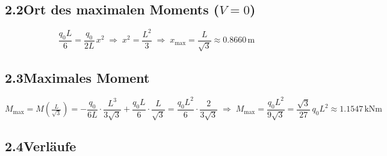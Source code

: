 \documentclass[a4paper,11pt]{article}
\begin{document}
\subsection*{2.2\quad Ort des maximalen Moments ($V = 0$)}

\[
  \frac{q_0 L}{6} = \frac{q_0}{2L}\,x^2
  \;\Rightarrow\; x^2 = \frac{L^2}{3}
  \;\Rightarrow\; \boxed{x_{\max} = \frac{L}{\sqrt{3}} \approx 0.8660\,\text{m}}
\]

\subsection*{2.3\quad Maximales Moment}

\[
  M_{\max} = M\!\left(\tfrac{L}{\sqrt{3}}\right)
  = -\frac{q_0}{6L}\cdot\frac{L^3}{3\sqrt{3}} + \frac{q_0 L}{6}\cdot\frac{L}{\sqrt{3}}
  = \frac{q_0 L^2}{6}\cdot\frac{2}{3\sqrt{3}}
  \;\Rightarrow\;
  \boxed{M_{\max} = \frac{q_0 L^2}{9\sqrt{3}}
         = \frac{\sqrt{3}}{27}\,q_0 L^2 \approx 1.1547\,\text{kNm}}
\]

\subsection*{2.4\quad Verläufe}
\end{document}

